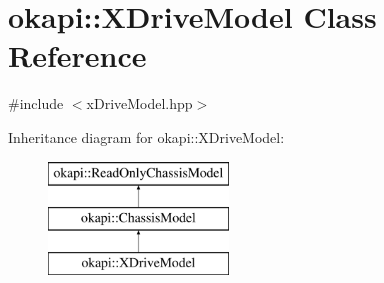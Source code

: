 \hypertarget{classokapi_1_1XDriveModel}{}\section{okapi\+::X\+Drive\+Model Class Reference}
\label{classokapi_1_1XDriveModel}


{\ttfamily \#include $<$x\+Drive\+Model.\+hpp$>$}

Inheritance diagram for okapi\+::X\+Drive\+Model\+:\begin{figure}[H]
\begin{center}
\leavevmode
\includegraphics[height=3.000000cm]{classokapi_1_1XDriveModel}
\end{center}
\end{figure}
